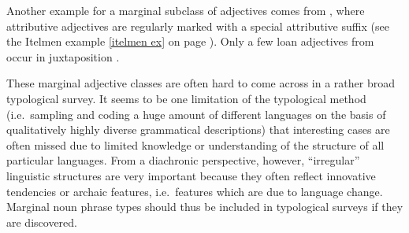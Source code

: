 Another example for a marginal subclass of adjectives comes from , where attributive adjectives are regularly marked with a special attributive suffix (see the Itelmen example \ref{itelmen ex} on page \pageref{itelmen synchr}). Only a few loan adjectives from  occur in juxtaposition \citep[60–71]{volodin1997}.

These marginal adjective classes are often hard to come across in a rather broad typological survey. It seems to be one limitation of the typological method (i.e.~sampling and coding a huge amount of different languages on the basis of qualitatively highly diverse grammatical descriptions) that interesting cases are often missed due to limited knowledge or understanding of the structure of all particular languages. From a diachronic perspective, however, “irregular” linguistic structures are very important because they often reflect innovative tendencies or archaic features, i.e.~features which are due to language change. Marginal noun phrase types should thus be included in typological surveys if they are discovered.


